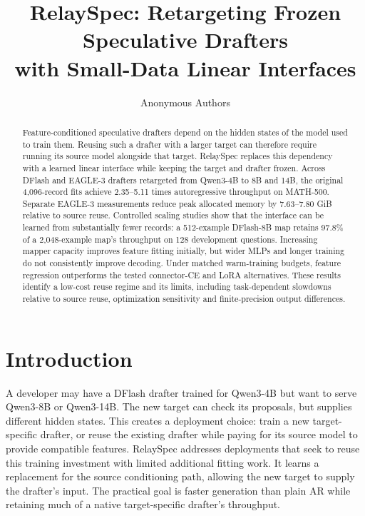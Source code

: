 \documentclass{article}
\title{RelaySpec: Retargeting Frozen Speculative Drafters\\with Small-Data Linear Interfaces}
\author{Anonymous Authors}
\begin{document}
\maketitle

\begin{abstract}
Feature-conditioned speculative drafters depend on the hidden states of
 the model used to train them. Reusing such a drafter with a larger target
 can therefore require running its source model alongside that target.
RelaySpec replaces this dependency with a learned linear interface while
keeping the target and drafter frozen. Across DFlash and EAGLE-3 drafters
retargeted from Qwen3-4B to 8B and 14B, the original 4,096-record fits
achieve 2.35--5.11 times autoregressive throughput on MATH-500.
Separate EAGLE-3 measurements reduce peak allocated memory by
7.63--7.80 GiB relative to source reuse. Controlled scaling studies show
that the interface can be learned from substantially fewer records:
a 512-example DFlash-8B map retains 97.8\% of a 2,048-example map's
throughput on 128 development questions. Increasing mapper capacity
improves feature fitting initially, but wider MLPs and longer training
do not consistently improve decoding. Under matched warm-training
budgets, feature regression outperforms the tested connector-CE and
LoRA alternatives. These results identify a low-cost reuse regime and
its limits, including task-dependent slowdowns relative to source reuse,
optimization sensitivity and finite-precision output differences.
\end{abstract}

\section{Introduction}
\label{sec:introduction}

A developer may have a DFlash drafter trained for Qwen3-4B but want to
serve Qwen3-8B or Qwen3-14B. The new target can check its proposals,
but supplies different hidden states. This creates a deployment choice:
train a new target-specific drafter, or reuse the existing drafter while
paying for its source model to provide compatible features. RelaySpec
addresses deployments that seek to reuse this training investment with
limited additional fitting work. It learns a replacement for the source
conditioning path, allowing the new target to supply the drafter's input.
The practical goal is faster generation than plain AR while retaining
much of a native target-specific drafter's throughput.
\end{document}
